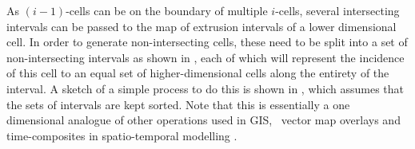 As $(i-1)$-cells can be on the boundary of multiple $i$-cells, several intersecting intervals can be passed to the map of extrusion intervals of a lower dimensional cell.
In order to generate non-intersecting cells, these need to be split into a set of non-intersecting intervals as shown in , each of which will represent the incidence of this cell to an equal set of higher-dimensional cells along the entirety of the interval.
A sketch of a simple process to do this is shown in , which assumes that the sets of intervals are kept sorted.
Note that this is essentially a one dimensional analogue of other operations used in GIS, \eg\ vector map overlays \citep[\S{}2.3]{deBerg08} and time-composites in spatio-temporal modelling \citep{Langran88}.

